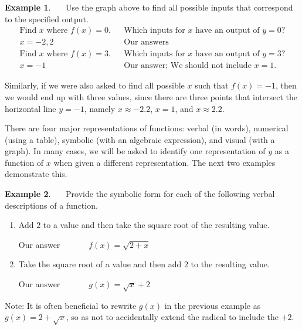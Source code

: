 \documentclass[12pt]{book}
\theoremstyle{definition}
\newtheorem{example}{Example}
\begin{document}
\begin{example}~~~Use the graph above to find all possible inputs that correspond to the specified output.
  \begin{eqnarray*}
    \text{Find~} x \text{~where~} f (x) = 0. & & \text{Which inputs for~} x \text{~have an output of~} y=0?\\
   x=-2,2 &  & \text{Our answers}\\
    \text{Find~} x \text{~where~} f (x) = 3. & & \text{Which inputs for~} x \text{~have an output of~} y=3?\\
   x=-1 & & \text{Our answer; We should not include~} x=1.
	\end{eqnarray*}
 \end{example}
Similarly, if we were also asked to find all possible $x$ such that $f(x)=-1$, then we would end up with three values, since there are three points that intersect the horizontal line $y=-1$, namely $x\approx -2.2$, $x=1$, and $x\approx 2.2$.\par
There are four major representations of functions: verbal (in words), numerical (using a table), symbolic (with an algebraic expression), and visual (with a graph).
In many cases, we will be asked to identify one representation of $y$ as a function of $x$ when given a different representation.  The next two examples demonstrate this.
\begin{example}~~~Provide the symbolic form for each of the following verbal descriptions of a function.
\begin{enumerate}
	\item Add $2$ to a value and then take the square root of the resulting value. 
\begin{center}
Our answer~~~~~~~$f(x)=\sqrt{2+x}$
\end{center}
	\item Take the square root of a value and then add $2$ to the resulting value.
\begin{center}
Our answer~~~~~~~$g(x)=\sqrt{x}+2$
\end{center}
\end{enumerate}
\end{example}
Note: It is often beneficial to rewrite $g(x)$ in the previous example as $g(x)=2+\sqrt{x}$, so as not to accidentally extend the radical to include the $+2$.
\end{document}
